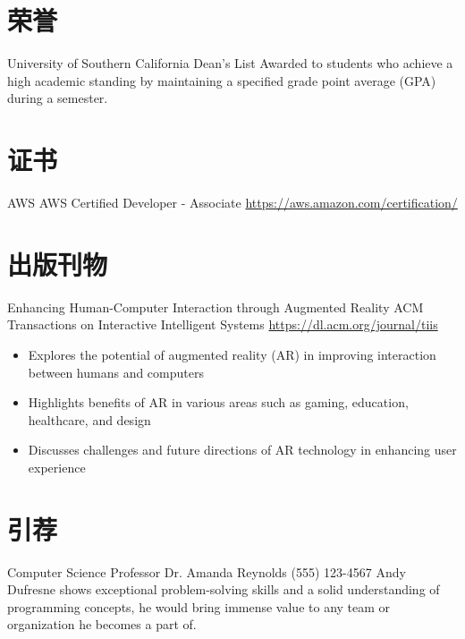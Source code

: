 \documentclass[a4paper, serif, 11pt]{moderncv}
\begin{document}

\section{荣誉}

        {University of Southern California}
        {Dean's List}
        {}
        {}
        {Awarded to students who achieve a high academic standing by maintaining a specified grade point average (GPA) during a semester.}

\section{证书}

        {AWS}
        {AWS Certified Developer - Associate}
        {\href{https://aws.amazon.com/certification/}{https://aws.amazon.com/certification/}}
        {}
        {}

\section{出版刊物}

        {Enhancing Human-Computer Interaction through Augmented Reality}
        {ACM Transactions on Interactive Intelligent Systems}
        {\href{https://dl.acm.org/journal/tiis}{https://dl.acm.org/journal/tiis}}
        {}
        {\begin{itemize}
\item Explores the potential of augmented reality (AR) in improving interaction between humans and computers
\item Highlights benefits of AR in various areas such as gaming, education, healthcare, and design
\item Discusses challenges and future directions of AR technology in enhancing user experience
\end{itemize}}

\section{引荐}

        {Computer Science Professor}
        {Dr. Amanda Reynolds}
        {(555) 123-4567}
        {}
        {Andy Dufresne shows exceptional problem-solving skills and a solid understanding of programming concepts, he would bring immense value to any team or organization he becomes a part of.}
\end{document}

